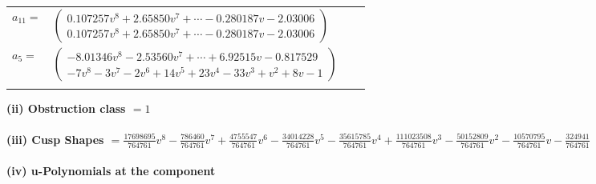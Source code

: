 \documentclass[1p]{elsarticle_modified}
\theoremstyle{definition}
\begin{document}
\begin{tabular}{m{7pt} m{180pt} m{7pt} m{180pt} }
\flushright $a_{11}=$&$\begin{pmatrix}0.107257 v^{8}+2.65850 v^{7}+\cdots-0.280187 v-2.03006\\0.107257 v^{8}+2.65850 v^{7}+\cdots-0.280187 v-2.03006\end{pmatrix}$ \\
\flushright $a_{5}=$&$\begin{pmatrix}-8.01346 v^{8}-2.53560 v^{7}+\cdots+6.92515 v-0.817529\\-7 v^8-3 v^7-2 v^6+14 v^5+23 v^4-33 v^3+v^2+8 v-1\end{pmatrix}$\\&\end{tabular}
\flushleft \textbf{(ii) Obstruction class $= 1$}\\~\\
\flushleft \textbf{(iii) Cusp Shapes $= \frac{17698695}{764761} v^8-\frac{786460}{764761} v^7+\frac{4755547}{764761} v^6-\frac{34014228}{764761} v^5-\frac{35615785}{764761} v^4+\frac{111023508}{764761} v^3-\frac{50152809}{764761} v^2-\frac{10570795}{764761} v-\frac{324941}{764761}$}\\~\\
\newpage\renewcommand{\arraystretch}{1}
\flushleft \textbf{(iv) u-Polynomials at the component}\newline \\
\end{document}
